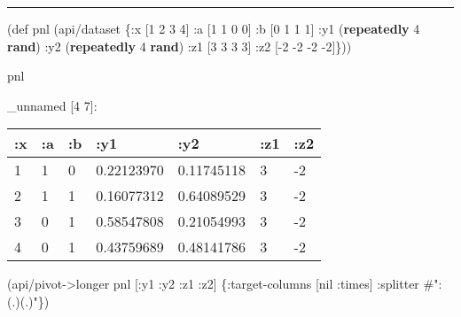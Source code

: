 \documentclass[]{article}
\newenvironment{Shaded}{\begin{snugshade}}{\end{snugshade}}
\newcommand{\AttributeTok}[1]{\textcolor[rgb]{0.77,0.63,0.00}{#1}}
\newcommand{\BuiltInTok}[1]{#1}
\newcommand{\DecValTok}[1]{\textcolor[rgb]{0.00,0.00,0.81}{#1}}
\newcommand{\FunctionTok}[1]{\textcolor[rgb]{0.00,0.00,0.00}{#1}}
\newcommand{\KeywordTok}[1]{\textcolor[rgb]{0.13,0.29,0.53}{\textbf{#1}}}
\newcommand{\NormalTok}[1]{#1}
\newcommand{\SpecialStringTok}[1]{\textcolor[rgb]{0.31,0.60,0.02}{#1}}
\newcommand{\VariableTok}[1]{\textcolor[rgb]{0.00,0.00,0.00}{#1}}
\begin{document}
\begin{center}\rule{0.5\linewidth}{0.5pt}\end{center}

\begin{Shaded}
\begin{Highlighting}[]
\NormalTok{(}\BuiltInTok{def}\FunctionTok{ pnl }\NormalTok{(api/dataset \{}\AttributeTok{:x}\NormalTok{ [}\DecValTok{1} \DecValTok{2} \DecValTok{3} \DecValTok{4}\NormalTok{]}
                       \AttributeTok{:a}\NormalTok{ [}\DecValTok{1} \DecValTok{1} \DecValTok{0} \DecValTok{0}\NormalTok{]}
                       \AttributeTok{:b}\NormalTok{ [}\DecValTok{0} \DecValTok{1} \DecValTok{1} \DecValTok{1}\NormalTok{]}
                       \AttributeTok{:y1}\NormalTok{ (}\KeywordTok{repeatedly} \DecValTok{4} \KeywordTok{rand}\NormalTok{)}
                       \AttributeTok{:y2}\NormalTok{ (}\KeywordTok{repeatedly} \DecValTok{4} \KeywordTok{rand}\NormalTok{)}
                       \AttributeTok{:z1}\NormalTok{ [}\DecValTok{3} \DecValTok{3} \DecValTok{3} \DecValTok{3}\NormalTok{]}
                       \AttributeTok{:z2}\NormalTok{ [-}\DecValTok{2} \DecValTok{-2} \DecValTok{-2} \DecValTok{-2}\NormalTok{]\}))}
\end{Highlighting}
\end{Shaded}

\begin{Shaded}
\begin{Highlighting}[]
\NormalTok{pnl}
\end{Highlighting}
\end{Shaded}

\_unnamed {[}4 7{]}:

\begin{longtable}[]{@{}lllllll@{}}
\toprule
:x & :a & :b & :y1 & :y2 & :z1 & :z2\tabularnewline
\midrule
\endhead
1 & 1 & 0 & 0.22123970 & 0.11745118 & 3 & -2\tabularnewline
2 & 1 & 1 & 0.16077312 & 0.64089529 & 3 & -2\tabularnewline
3 & 0 & 1 & 0.58547808 & 0.21054993 & 3 & -2\tabularnewline
4 & 0 & 1 & 0.43759689 & 0.48141786 & 3 & -2\tabularnewline
\bottomrule
\end{longtable}

\begin{Shaded}
\begin{Highlighting}[]
\NormalTok{(api/pivot->longer pnl [}\AttributeTok{:y1} \AttributeTok{:y2} \AttributeTok{:z1} \AttributeTok{:z2}\NormalTok{] \{}\AttributeTok{:target-columns}\NormalTok{ [}\VariableTok{nil} \AttributeTok{:times}\NormalTok{]}
                                          \AttributeTok{:splitter} \SpecialStringTok{#":(.)(.)"}\NormalTok{\})}
\end{Highlighting}
\end{Shaded}
\end{document}
